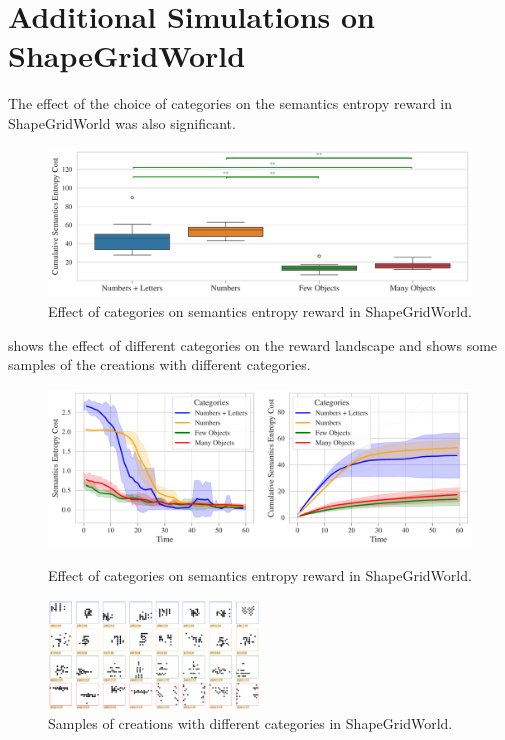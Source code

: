 \chapter{Additional Simulations on ShapeGridWorld}
\label{sec:sgw-semantics-additional}

The effect of the choice of categories on the semantics entropy reward in ShapeGridWorld was also significant.

\begin{figure}[h]
    \centering
    \includegraphics[width=\textwidth]{images/categories_boxplot_sgw_rair.pdf}
    \caption{Effect of categories on semantics entropy reward in ShapeGridWorld.}
    \label{fig:categories-boxplot-sgw}
\end{figure}

 shows the effect of different categories on the reward landscape and  shows some samples of the creations with different categories.

\begin{figure}[h]
    \centering
    \includegraphics[width=\textwidth]{images/categories_comparison_sgw_rair.pdf}
    \caption{Effect of categories on semantics entropy reward in ShapeGridWorld.}
    \label{fig:categories-sgw}
    \vspace{12pt}
    \includegraphics[width=0.5\textwidth]{images/categories_samples_sgw_rair.pdf}
    \caption{Samples of creations with different categories in ShapeGridWorld.}
    \label{fig:categories-samples-sgw}
\end{figure}

